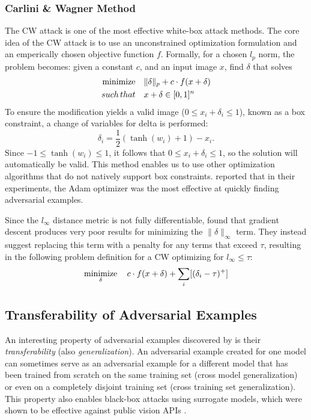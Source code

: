 \subsubsection{Carlini \& Wagner Method}
The \ac{CW} attack \parencite{carlini2017towards} is one of the most effective white-box attack methods. The core idea of the \ac{CW} attack is to use an unconstrained optimization formulation and an emperically chosen objective function $f$. Formally, for a chosen $l_p$ norm, the problem becomes: given a constant $c$, and an input image $x$, find $\delta$ that solves
\begin{align}
\operatorname*{minimize} \quad& \|\delta\|_p + c \cdot f(x+\delta)\\
such\,that \quad& x+ \delta \in[0,1]^n
\label{eq:cw}
\end{align}
To ensure the modification yields a valid image ($0\le x_i+\delta_i \le 1$), known  as  a  box constraint, a change of variables for delta is performed:
\begin{equation}
\delta_i=\frac{1}{2}(\tanh(w_i) + 1) - x_i.
\label{eq:tanh-trick}
\end{equation}
Since $-1 \le \tanh(w_i) \le 1$, it follows that $0 \le x_i+\delta_i\le 1$, so the solution will automatically be valid. This method enables us to use other optimization algorithms that do not natively support box constraints. \cite{carlini2017towards} reported that in their experiments, the Adam \parencite{Kingma:2014} optimizer was the most effective at quickly finding adversarial examples.

Since the $l_\infty$ distance metric is not fully differentiable, \cite{carlini2017towards} found that gradient descent produces very poor results for minimizing the $\|\delta\|_\infty$ term. They instead suggest replacing this term with a penalty for any terms that exceed $\tau$, resulting in the following problem definition for a \ac{CW} optimizing for $l_\infty\le\tau$:
\begin{equation}
\operatorname*{minimize}_\delta \quad c\cdot f(x+\delta) + \sum_i [(\delta_i-\tau)^+]
\label{eq:cw-linf}
\end{equation}

\subsection{Transferability of Adversarial Examples}
An interesting property of adversarial examples discovered by \cite{szegedy2013intriguing} is their \textit{transferability} (also \textit{generalization}).  An adversarial example created for one model can sometimes serve as an adversarial example for a different model that has been trained from scratch on the same training set (cross model generalization) or even on a completely disjoint training set (cross training set generalization). This property also enables black-box attacks using surrogate models, which were shown to be effective against public vision \acp{API} \parencite{ilyas2018black}.

